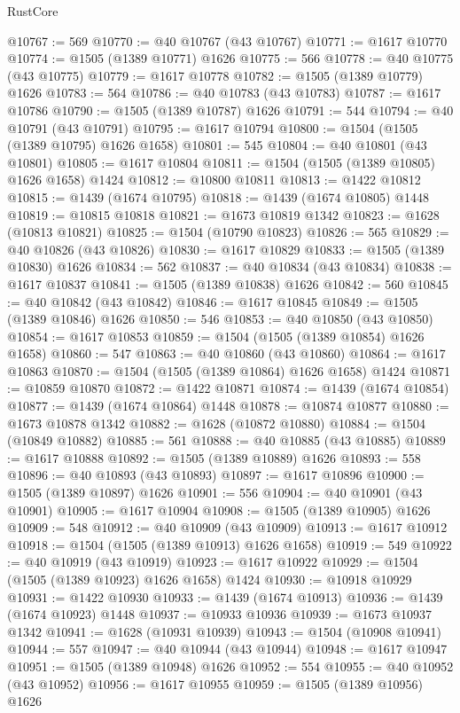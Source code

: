 \begin{lexlean}{RustCore}
\begin{coremodule}
@10767 := 569
@10770 := @40 @10767 (@43 @10767)
@10771 := @1617 @10770
@10774 := @1505 (@1389 @10771) @1626
@10775 := 566
@10778 := @40 @10775 (@43 @10775)
@10779 := @1617 @10778
@10782 := @1505 (@1389 @10779) @1626
@10783 := 564
@10786 := @40 @10783 (@43 @10783)
@10787 := @1617 @10786
@10790 := @1505 (@1389 @10787) @1626
@10791 := 544
@10794 := @40 @10791 (@43 @10791)
@10795 := @1617 @10794
@10800 := @1504 (@1505 (@1389 @10795) @1626 @1658)
@10801 := 545
@10804 := @40 @10801 (@43 @10801)
@10805 := @1617 @10804
@10811 := @1504 (@1505 (@1389 @10805) @1626 @1658) @1424
@10812 := @10800 @10811
@10813 := @1422 @10812
@10815 := @1439 (@1674 @10795)
@10818 := @1439 (@1674 @10805) @1448
@10819 := @10815 @10818
@10821 := @1673 @10819 @1342
@10823 := @1628 (@10813 @10821)
@10825 := @1504 (@10790 @10823)
@10826 := 565
@10829 := @40 @10826 (@43 @10826)
@10830 := @1617 @10829
@10833 := @1505 (@1389 @10830) @1626
@10834 := 562
@10837 := @40 @10834 (@43 @10834)
@10838 := @1617 @10837
@10841 := @1505 (@1389 @10838) @1626
@10842 := 560
@10845 := @40 @10842 (@43 @10842)
@10846 := @1617 @10845
@10849 := @1505 (@1389 @10846) @1626
@10850 := 546
@10853 := @40 @10850 (@43 @10850)
@10854 := @1617 @10853
@10859 := @1504 (@1505 (@1389 @10854) @1626 @1658)
@10860 := 547
@10863 := @40 @10860 (@43 @10860)
@10864 := @1617 @10863
@10870 := @1504 (@1505 (@1389 @10864) @1626 @1658) @1424
@10871 := @10859 @10870
@10872 := @1422 @10871
@10874 := @1439 (@1674 @10854)
@10877 := @1439 (@1674 @10864) @1448
@10878 := @10874 @10877
@10880 := @1673 @10878 @1342
@10882 := @1628 (@10872 @10880)
@10884 := @1504 (@10849 @10882)
@10885 := 561
@10888 := @40 @10885 (@43 @10885)
@10889 := @1617 @10888
@10892 := @1505 (@1389 @10889) @1626
@10893 := 558
@10896 := @40 @10893 (@43 @10893)
@10897 := @1617 @10896
@10900 := @1505 (@1389 @10897) @1626
@10901 := 556
@10904 := @40 @10901 (@43 @10901)
@10905 := @1617 @10904
@10908 := @1505 (@1389 @10905) @1626
@10909 := 548
@10912 := @40 @10909 (@43 @10909)
@10913 := @1617 @10912
@10918 := @1504 (@1505 (@1389 @10913) @1626 @1658)
@10919 := 549
@10922 := @40 @10919 (@43 @10919)
@10923 := @1617 @10922
@10929 := @1504 (@1505 (@1389 @10923) @1626 @1658) @1424
@10930 := @10918 @10929
@10931 := @1422 @10930
@10933 := @1439 (@1674 @10913)
@10936 := @1439 (@1674 @10923) @1448
@10937 := @10933 @10936
@10939 := @1673 @10937 @1342
@10941 := @1628 (@10931 @10939)
@10943 := @1504 (@10908 @10941)
@10944 := 557
@10947 := @40 @10944 (@43 @10944)
@10948 := @1617 @10947
@10951 := @1505 (@1389 @10948) @1626
@10952 := 554
@10955 := @40 @10952 (@43 @10952)
@10956 := @1617 @10955
@10959 := @1505 (@1389 @10956) @1626

\end{coremodule}
\end{lexlean}
